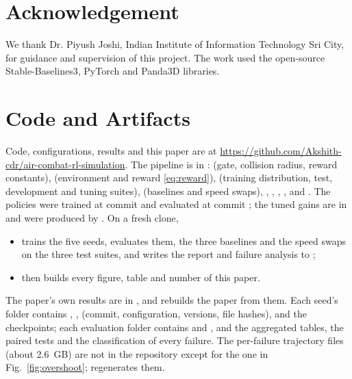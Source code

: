 \documentclass[conference]{IEEEtran}
\newcommand{\repo}{\url{https://github.com/Akshith-cdr/air-combat-rl-simulation}}
\begin{document}
\section*{Acknowledgement}
We thank Dr. Piyush Joshi, Indian Institute of Information Technology Sri City, for guidance and supervision of this project. The work used the open-source Stable-Baselines3, PyTorch and Panda3D \cite{goslin2004panda3d} libraries.

\appendix
\section*{Code and Artifacts}
Code, configurations, results and this paper are at \repo. The pipeline is in :  (gate, collision radius, reward constants),  (environment and reward \eqref{eq:reward}),  (training distribution, test, development and tuning suites),  (baselines and speed swaps), , , , ,  and . The policies were trained at commit \texttt{\RTrainCommit} and evaluated at commit \texttt{\REvalCommit}; the tuned gains are in  and were produced by . On a fresh clone,
\begin{itemize}
\item {} trains the five seeds, evaluates them, the three baselines and the speed swaps on the three test suites, and writes the report and failure analysis to ;
\item {} then builds every figure, table and number of this paper.
\end{itemize}
The paper's own results are in , and  rebuilds the paper from them. Each seed's folder  contains , ,  (commit, configuration, versions, file hashes),  and the checkpoints; each evaluation folder  contains  and , and  the aggregated tables, the paired tests and the classification of every failure. The per-failure trajectory files (about 2.6~GB) are not in the repository except for the one in Fig.~\ref{fig:overshoot};  regenerates them.

\FloatBarrier


\end{document}
